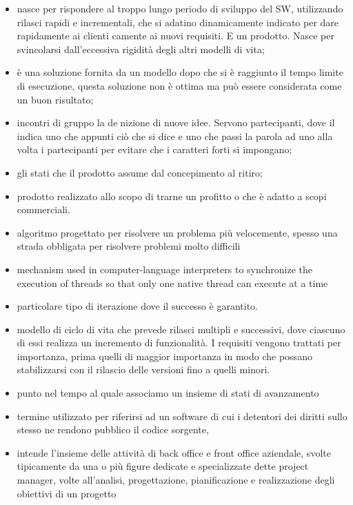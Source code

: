 
\begin{itemize} 
	\item {} nasce per rispondere al troppo lungo periodo di sviluppo del SW, utilizzando rilasci rapidi e incrementali, che si adatino dinamicamente indicato per dare rapidamente ai clienti camente ai nuovi requisiti. E un prodotto. Nasce per svincolarsi dall'eccessiva rigidità degli altri modelli di vita;
	\item {} è una soluzione fornita da un modello dopo che si è raggiunto il tempo limite di esecuzione, questa soluzione non è ottima ma può essere considerata come un buon risultato;
	\item {} incontri di gruppo la denizione di nuove idee. Servono partecipanti, dove il indica uno che appunti ciò che si dice e uno che passi la parola ad uno alla volta i partecipanti per evitare che i caratteri forti si impongano;
	\item {} gli stati che il prodotto assume dal concepimento al ritiro;
	\item {} prodotto realizzato allo scopo di trarne un profitto o che è adatto a scopi commerciali.
	\item {} algoritmo progettato per risolvere un problema più velocemente, spesso una strada obbligata per risolvere problemi molto difficili
	\item {} mechanism used in computer-language interpreters to synchronize the execution of threads so that only one native thread can execute at a time
	\item {} particolare tipo di iterazione dove il successo è garantito.
	\item {} modello di ciclo di vita che prevede rilasci multipli e successivi, dove ciascuno di essi realizza un incremento di funzionalità. I requisiti vengono trattati per importanza, prima quelli di maggior importanza in modo che possano stabilizzarsi con il rilascio delle versioni fino a quelli minori.
	\item {} punto nel tempo al quale associamo un insieme di stati di avanzamento
	\item {} termine utilizzato per riferirsi ad un software di cui i detentori dei diritti sullo stesso ne rendono pubblico il codice sorgente,
	\item {} intende l'insieme delle attività di back office e front office aziendale, svolte tipicamente da una o più figure dedicate e specializzate dette project manager, volte all'analisi, progettazione, pianificazione e realizzazione degli obiettivi di un progetto

\end{itemize}

